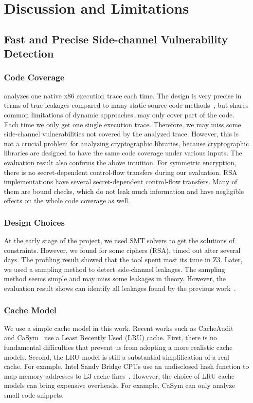 \chapter{Discussion and Limitations}\label{chapter6}
\section{Fast and Precise Side-channel Vulnerability Detection}
\subsection*{Code Coverage} \detect{} analyzes one native x86 execution trace each time. The design is very precise in terms of true leakages compared to many static source code methods~\cite{197207,BacelarAlmeida:2013:FVS:2483313.2483334}, but shares common limitations of dynamic approaches. \detect{} may only cover part of the code. Each time we only get one single execution trace. Therefore, we may miss some side-channel vulnerabilities not covered by the analyzed trace. However, this is not a crucial problem for analyzing cryptographic libraries, because cryptographic libraries are designed to have the same code coverage under various inputs. The evaluation result also confirms the above intuition. For symmetric encryption, there is no secret-dependent control-flow transfers during our evaluation. RSA implementations have several secret-dependent control-flow transfers. Many of them are bound checks, which do not leak much information and have negligible effects on the whole code coverage as well.

\subsection*{Design Choices} At the early stage of the project, we used SMT solvers to get the solutions of constraints. However, we found for some ciphers (RSA), \detect{} timed out after several days. The profiling result showed that the tool spent most its time in Z3. Later, we used a sampling method to detect side-channel leakages. The sampling method seems simple and may miss some leakages in theory. However, the evaluation result shows \detect{} can identify all leakages found by the previous work~\cite{203878,236338,Brotzman19Casym}.  

\subsection*{Cache Model} We use a simple cache model in this work. Recent works such as CacheAudit~\cite{182946} and CaSym~\cite{Brotzman19Casym} use a Least Recently Used (LRU) cache. First, there is no fundamental difficulties that prevent us from adopting a more realistic cache models. Second, the LRU model is still a substantial simplification of a real cache. For example, Intel Sandy Bridge CPUs use an undisclosed hash function to map memory addresses to L3 cache lines~\cite{farshin2019make}. However, the choice of LRU  cache models can bring expensive overheads. For example, CaSym can only analyze small code snippets.

